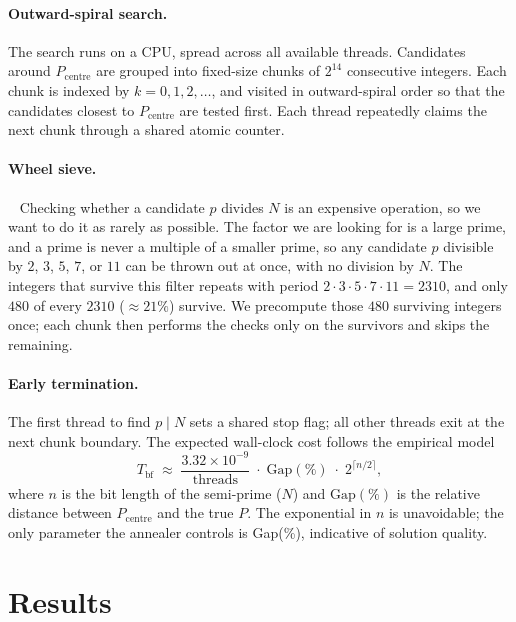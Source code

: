 \documentclass[pdflatex,sn-apa]{sn-jnl}%
\theoremstyle{thmstyleone}%
\theoremstyle{thmstyletwo}%
\theoremstyle{thmstylethree}%
\begin{document}
\paragraph{Outward-spiral search.} The search runs on a CPU, spread across all available threads. Candidates around $P_{\mathrm{centre}}$ are grouped into fixed-size chunks of $2^{14}$ consecutive integers. Each chunk is indexed by $k = 0, 1, 2, \dots$, and visited in outward-spiral order so that the candidates closest to $P_{\mathrm{centre}}$ are tested first. Each thread repeatedly claims the next chunk through a shared atomic counter.

\paragraph{Wheel sieve.}~\citep{Pritchard1982} Checking whether a candidate $p$ divides $N$ is an expensive operation, so we want to do it as rarely as possible. The factor we are looking for is a large prime, and a prime is never a multiple of a smaller prime, so any candidate $p$ divisible by $2$, $3$, $5$, $7$, or $11$ can be thrown out at once, with no division by $N$. The integers that survive this filter repeats with period $2 \cdot 3 \cdot 5 \cdot 7 \cdot 11 = 2310$, and only $480$ of every $2310$ ($\approx 21\%$) survive. We precompute those $480$ surviving integers once; each chunk then performs the checks only on the survivors and skips the remaining.

\paragraph{Early termination.} The first thread to find $p \mid N$ sets a shared stop flag; all other threads exit at the next chunk boundary. The expected wall-clock cost follows the empirical model
\begin{equation}
  T_{\mathrm{bf}} \;\approx\;
  \frac{3.32 \times 10^{-9}}{\mathrm{threads}} \;\cdot\;
  \mathrm{Gap}(\%) \;\cdot\; 2^{\lceil n/2 \rceil},
  \label{eq:bf-time}
\end{equation}
where $n$ is the bit length of the semi-prime ($N$) and $\mathrm{Gap}(\%)$ is the relative distance between $P_{\mathrm{centre}}$ and the true $P$. The exponential in $n$ is unavoidable; the only parameter the annealer controls is Gap(\%), indicative of solution quality.

\section{Results}\label{sec:results}
\end{document}

